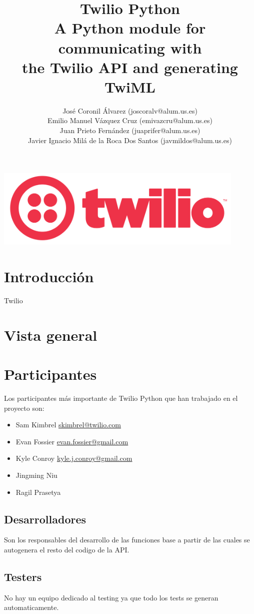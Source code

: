 \documentclass{article}
\title{%
  Twilio Python \\
  \large A Python module for communicating with \\
  the Twilio API and generating TwiML}
\author{José Coronil Álvarez (joscoralv@alum.us.es) \\
Emilio Manuel Vázquez Cruz (emivazcru@alum.us.es) \\
Juan Prieto Fernández (juaprifer@alum.us.es) \\
Javier Ignacio Milá de la Roca Dos Santos (javmildos@alum.us.es) \\}
\date{}
\begin{document}
\begin{titlepage}
  \centering
  \vfill
  {\bfseries\Large
      \thetitle
  }    
  \vfill
  \includegraphics[width=12cm]{logo.png} %
  \vfill
  \theauthor
\end{titlepage}



\section{Introducción}

Twilio \cite{knuthwebsite}

\section{Vista general}

\section{Participantes}
Los participantes más importante de Twilio Python que han trabajado en el proyecto son:
\begin{itemize}
  \item Sam Kimbrel \href{mailto:skimbrel@twilio.com}{skimbrel@twilio.com}
  \item Evan Fossier \href{mailto:evan.fossier@gmail.com}{evan.fossier@gmail.com}
  \item Kyle Conroy \href{mailto:kyle.j.conroy@gmail.com}{kyle.j.conroy@gmail.com}
  \item Jingming Niu 
  \item Ragil Prasetya 
  
  \end{itemize}
  
  \subsection*{Desarrolladores}
  Son los responsables del desarrollo de las funciones base a partir de las cuales se autogenera el resto del codigo de la API.
  \subsection*{Testers}
  No hay un equipo dedicado al testing ya que todo los tests se generan automaticamente.
\end{document}
